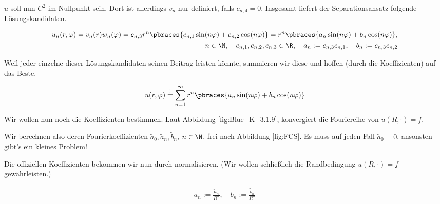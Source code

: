 \begin{solution}
\begin{enumerate}[label = (\roman*)]
    $u$ soll nun $C^2$ im Nullpunkt sein.
    Dort ist allerdings $v_n$ nur definiert, falls $c_{n, 4} = 0$.
    Insgesamt liefert der Separationsansatz folgende Lösungskandidaten.

    \begin{align*}
        u_n(r,\varphi)
        =
        v_n(r) w_n(\varphi)
        =
        c_{n, 3} r^n
        \pbraces
        {
            c_{n, 1} \sin(n \varphi)
            +
            c_{n, 2} \cos(n \varphi)
        }
        =
        r^n
        \pbraces
        {
            a_n \sin(n \varphi)
            +
            b_n \cos(n \varphi)
        }, \\
        n \in \N,
        \quad
        c_{n, 1}, c_{n, 2}, c_{n, 3} \in \R,
        \quad
        a_n := c_{n, 3} c_{n, 1},
        \quad
        b_n := c_{n, 3} c_{n, 2}
    \end{align*}

    Weil jeder einzelne dieser Lösungskandidaten seinen Beitrag leisten könnte, summieren wir diese und hoffen (durch die Koeffizienten) auf das Beste.

    \begin{align*}
        u(r, \varphi)
        \stackrel{!}{=}
        \sum_{n=1}^\infty
        r^n
        \pbraces
        {
            a_n \sin(n \varphi)
            +
            b_n \cos(n \varphi)
        }
    \end{align*}

    Wir wollen nun noch die Koeffizienten bestimmen.
    Laut Abbildung \ref{fig:Blue_K_3.1.9}, konvergiert die Fouriereihe von $u(R, \cdot) = f$.


    Wir berechnen also deren Fourierkoeffizienten $\tilde{a}_0, \tilde{a}_n, \tilde{b}_n$, $n \in \N$, frei nach Abbildung \ref{fig:FCS}.
    Es muss auf jeden Fall $\tilde{a}_0 = 0$, ansonsten gibt's ein kleines Problem!


    Die offiziellen Koeffizienten bekommen wir nun durch normalisieren.
    (Wir wollen schließlich die Randbedingung $u(R, \cdot) = f$ gewährleisten.)

    \begin{align*}
        a_n := \frac{\tilde{a}_n}{R^n},
        \quad
        b_n := \frac{\tilde{b}_n}{R^n}
    \end{align*}


\end{enumerate}
\end{solution}
